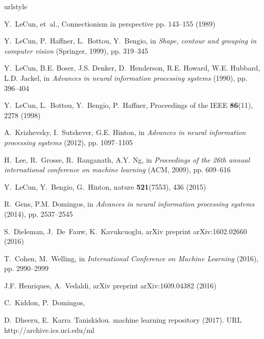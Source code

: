 \documentclass{svproc}
\begin{document}
\begin{thebibliography}{10}
	\providecommand{\url}[1]{{#1}}
	\providecommand{\urlprefix}{URL }
	\expandafter\ifx\csname urlstyle\endcsname\relax
	\providecommand{\doi}[1]{DOI \discretionary{}{}{}#1}\else
	\providecommand{\doi}{DOI \discretionary{}{}{}\begingroup
		\urlstyle{rm}\Url}\fi
	
	Y.~LeCun, et~al., Connectionism in perspective pp. 143--155 (1989)
	
	Y.~LeCun, P.~Haffner, L.~Bottou, Y.~Bengio, in \emph{Shape, contour and
		grouping in computer vision} (Springer, 1999), pp. 319--345
	
	Y.~LeCun, B.E. Boser, J.S. Denker, D.~Henderson, R.E. Howard, W.E. Hubbard,
	L.D. Jackel, in \emph{Advances in neural information processing systems}
	(1990), pp. 396--404
	
	Y.~LeCun, L.~Bottou, Y.~Bengio, P.~Haffner, Proceedings of the IEEE
	\textbf{86}(11), 2278 (1998)
	
	A.~Krizhevsky, I.~Sutskever, G.E. Hinton, in \emph{Advances in neural
		information processing systems} (2012), pp. 1097--1105
	
	H.~Lee, R.~Grosse, R.~Ranganath, A.Y. Ng, in \emph{Proceedings of the 26th
		annual international conference on machine learning} (ACM, 2009), pp.
	609--616
	
	Y.~LeCun, Y.~Bengio, G.~Hinton, nature \textbf{521}(7553), 436 (2015)
	
	R.~Gens, P.M. Domingos, in \emph{Advances in neural information processing
		systems} (2014), pp. 2537--2545
	
	S.~Dieleman, J.~De~Fauw, K.~Kavukcuoglu, arXiv preprint arXiv:1602.02660
	(2016)
	
	T.~Cohen, M.~Welling, in \emph{International Conference on Machine Learning}
	(2016), pp. 2990--2999
	
	J.F. Henriques, A.~Vedaldi, arXiv preprint arXiv:1609.04382  (2016)
	
	C.~Kiddon, P.~Domingos,
	
	D.~Dheeru, E.~Karra~Taniskidou.
	 machine learning repository (2017).
	\newblock \urlprefix\url{http://archive.ics.uci.edu/ml}
	

\end{thebibliography}
\end{document}
